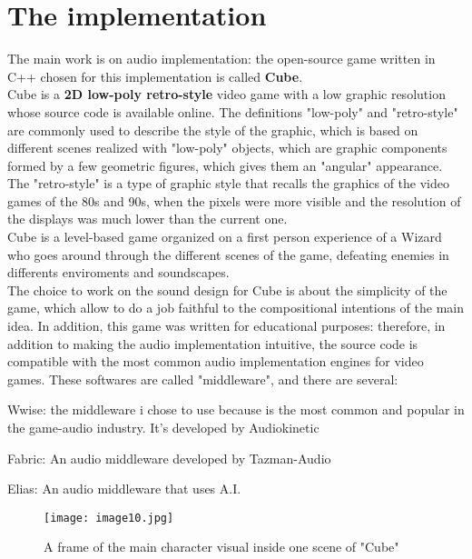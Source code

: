 
\chapter{The implementation}
\label{chp:fundamentals}

The main work is on audio implementation: the open-source game written in C++ chosen for this implementation is called \textbf{Cube}. \\
Cube is a \textbf{2D low-poly retro-style} video game with a low graphic resolution whose source code is available online. The definitions "low-poly" and "retro-style" are commonly used to describe the style of the graphic, which is based on different scenes realized with "low-poly" objects, which are graphic components formed by a few geometric figures, which gives them an "angular" appearance. The "retro-style" is a type of graphic style that recalls the graphics of the video games of the 80s and 90s, when the pixels were more visible and the resolution of the displays was much lower than the current one. \\
Cube is a level-based game organized on a first person experience of a Wizard who goes around through the different scenes of the game, defeating enemies in differents enviroments and soundscapes. \\
The choice to work on the sound design for Cube is about the simplicity of the game, which allow to do a job faithful to the compositional intentions of the main idea. In addition, this game was written for educational purposes: therefore, in addition to making the audio implementation intuitive, the source code is compatible with the most common audio implementation engines for video games. These softwares are called "middleware", and there are several:

\begin{compactitem}
	\item Wwise: the middleware i chose to use because is the most common and popular in the game-audio industry. It's developed by Audiokinetic
	\item Fabric: An audio middleware developed by Tazman-Audio
	\item Elias: An audio middleware that uses A.I.
\end{compactitem}

\begin{figure}[h]
	\begin{center}
		\texttt{[image: image10.jpg]}
		\caption{A frame of the main character visual inside one scene of "Cube"}
	\end{center}
\end{figure}

